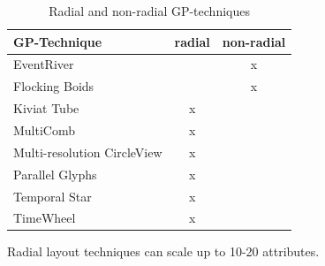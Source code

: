\begin{table}[H]
	\centering
	\caption[Table 1]{Radial and non-radial GP-techniques}
	\label{radialTable}
	\begin{tabu}{lcc}
	\toprule
	GP-Technique & radial & non-radial \\
	\midrule
	EventRiver &  & x \\
	Flocking Boids &  & x \\
	Kiviat Tube & x &  \\
	MultiComb & x &  \\
	Multi-resolution CircleView & x &  \\
	Parallel Glyphs & x &  \\
    Temporal Star & x &  \\
	TimeWheel & x & \\
	\bottomrule
	\end{tabu}
\end{table}

Radial layout techniques can scale up to 10-20 attributes.


